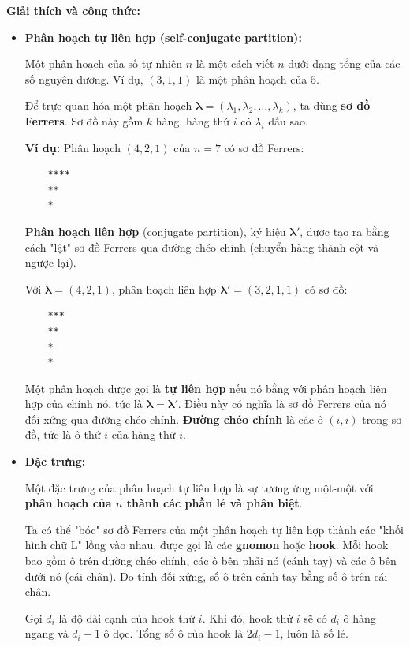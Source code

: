 \documentclass{article}
\begin{document}
\textbf{Giải thích và công thức:}
\begin{itemize}
    \item \textbf{Phân hoạch tự liên hợp (self-conjugate partition):}
    
    Một phân hoạch của số tự nhiên $n$ là một cách viết $n$ dưới dạng tổng của các số nguyên dương. Ví dụ, $(3,1,1)$ là một phân hoạch của $5$.

    Để trực quan hóa một phân hoạch $\boldsymbol\lambda = (\lambda_1, \lambda_2, \dots, \lambda_k)$, ta dùng \textbf{sơ đồ Ferrers}. Sơ đồ này gồm $k$ hàng, hàng thứ $i$ có $\lambda_i$ dấu sao.

    \textbf{Ví dụ:} Phân hoạch $(4,2,1)$ của $n=7$ có sơ đồ Ferrers:
    \begin{verbatim}
    ****
    **
    *
    \end{verbatim}

    \textbf{Phân hoạch liên hợp} (conjugate partition), ký hiệu $\boldsymbol\lambda'$, được tạo ra bằng cách "lật" sơ đồ Ferrers qua đường chéo chính (chuyển hàng thành cột và ngược lại).

    Với $\boldsymbol\lambda = (4,2,1)$, phân hoạch liên hợp $\boldsymbol\lambda' = (3,2,1,1)$ có sơ đồ:
    \begin{verbatim}
    ***
    **
    *
    *
    \end{verbatim}

    Một phân hoạch được gọi là \textbf{tự liên hợp} nếu nó bằng với phân hoạch liên hợp của chính nó, tức là $\boldsymbol\lambda = \boldsymbol\lambda'$. Điều này có nghĩa là sơ đồ Ferrers của nó đối xứng qua đường chéo chính. \textbf{Đường chéo chính} là các ô $(i,i)$ trong sơ đồ, tức là ô thứ $i$ của hàng thứ $i$.

    \item \textbf{Đặc trưng:}

    Một đặc trưng của phân hoạch tự liên hợp là sự tương ứng một-một với \textbf{phân hoạch của $n$ thành các phần lẻ và phân biệt}.

    Ta có thể "bóc" sơ đồ Ferrers của một phân hoạch tự liên hợp thành các "khối hình chữ L" lồng vào nhau, được gọi là các \textbf{gnomon} hoặc \textbf{hook}. Mỗi hook bao gồm ô trên đường chéo chính, các ô bên phải nó (cánh tay) và các ô bên dưới nó (cái chân). Do tính đối xứng, số ô trên cánh tay bằng số ô trên cái chân.

    Gọi $d_i$ là độ dài cạnh của hook thứ $i$. Khi đó, hook thứ $i$ sẽ có $d_i$ ô hàng ngang và $d_i - 1$ ô dọc. Tổng số ô của hook là $2d_i - 1$, luôn là số lẻ.


\end{itemize}
\end{document}
